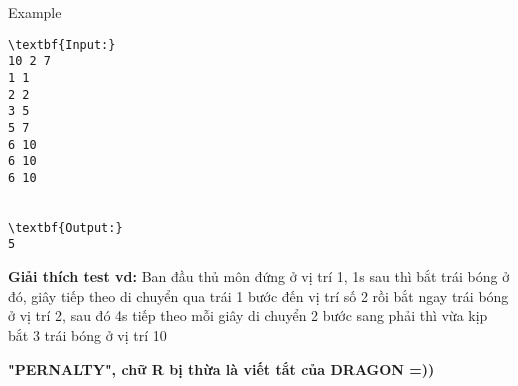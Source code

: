 Example
\begin{verbatim}
\textbf{Input:}
10 2 7
1 1
2 2
3 5
5 7
6 10
6 10
6 10


\textbf{Output:}
5
\end{verbatim}

\textbf{    Giải thích test vd:   }   Ban đầu thủ môn đứng ở vị trí 1, 1s sau thì bắt trái bóng ở đó, giây tiếp theo di chuyển qua trái 1 bước đến vị trí số 2 rồi bắt ngay trái bóng ở vị trí 2, sau đó 4s tiếp theo mỗi giây di chuyển 2 bước sang phải thì vừa kịp bắt 3 trái bóng ở vị trí 10   


\textbf{    "PERNALTY", chữ R bị thừa là viết tắt của DRAGON =))   }